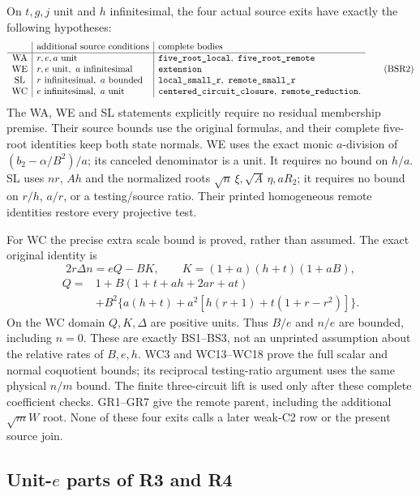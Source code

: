 On \(t,g,j\) unit and \(h\) infinitesimal, the four actual
source exits have exactly the following hypotheses:
\[
\begin{array}{c|l|l}
 &\text{additional source conditions}&\text{complete bodies}\\ \hline
 {\rm WA}&r,e,a\text{ unit}&
       \texttt{five\_root\_local},\ \texttt{five\_root\_remote}\\
 {\rm WE}&r,e\text{ unit},\ a\text{ infinitesimal}&
       \texttt{extension}\\
 {\rm SL}&r\text{ infinitesimal},\ a\text{ bounded}&
       \texttt{local\_small\_r},\ \texttt{remote\_small\_r}\\
 {\rm WC}&e\text{ infinitesimal},\ a\text{ unit}&
       \texttt{centered\_circuit\_closure},\
       \texttt{remote\_reduction}.
\end{array}
\tag{BSR2}
\]
The WA, WE and SL statements explicitly require no residual
membership premise.  Their source bounds use the original formulas,
and their complete five-root identities keep both state normals.
WE uses the exact monic \(a\)-division of
\((b_2-\alpha/B^2)/a\); its canceled denominator is a unit.
It requires no bound on \(h/a\).
SL uses \(nr\), \(Ah\) and the normalized roots
\(\sqrt n\,\xi,\sqrt A\,\eta,aR_2\); it requires no bound on
\(r/h\), \(a/r\), or a testing/source ratio.
Their printed homogeneous remote identities restore every
projective test.

For WC the precise extra scale bound is proved, rather than
assumed.  The exact original identity is
\[
 2r\Delta n=eQ-BK,\qquad
 K=(1+a)(h+t)(1+aB),
 \tag{BSR3}
\]
\[
 \begin{split}
 Q={}&1+B(1+t+ah+2ar+at)\\
    &+B^2\{a(h+t)+a^2[h(r+1)+t(1+r-r^2)]\}.
 \end{split}
\]
On the WC domain \(Q,K,\Delta\) are positive units.  Thus
\(B/e\) and \(n/e\) are bounded, including \(n=0\).
These are exactly BS1--BS3, not an unprinted assumption
about the relative rates of \(B,e,h\).
WC3 and WC13--WC18 prove the full scalar and normal coquotient
bounds; its reciprocal testing-ratio argument uses the same
physical \(n/m\) bound.  The finite three-circuit lift is used
only after these complete coefficient checks.  GR1--GR7 give
the remote parent, including the additional \(\sqrt m W\)
root.  None of these four exits calls a later weak-C2 row
or the present source join.

\subsection{Unit-\(e\) parts of R3 and R4}

